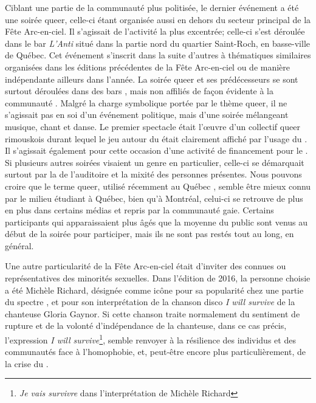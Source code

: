 Ciblant une partie de la communauté plus politisée, le dernier événement a été une soirée queer, celle-ci étant organisée aussi en dehors du secteur principal de la Fête Arc-en-ciel.
Il s'agissait de l'activité la plus excentrée; celle-ci s'est déroulée dans le bar \emph{L'Anti} situé dans la partie nord du quartier Saint-Roch, en basse-ville de Québec.
Cet événement  s'inscrit dans la suite d'autres à thématiques similaires organisées dans les éditions précédentes de la Fête Arc-en-ciel ou de manière indépendante ailleurs dans l'année.
La soirée queer et ses prédécesseurs se sont surtout déroulées dans des bars , mais non affiliés de façon évidente à la communauté \lgbt.
Malgré la charge symbolique portée par le thème queer, il ne s'agissait pas en soi d'un événement politique, mais d'une soirée mélangeant musique, chant et danse.
Le premier spectacle était l'œuvre d'un collectif queer rimouskois durant lequel le jeu autour du  était clairement affiché par l'usage du .
Il s'agissait également pour cette occasion d'une activité de financement pour le \ggul.
Si plusieurs autres soirées visaient un genre en particulier, celle-ci se démarquait surtout par la  de l'auditoire et la mixité des personnes présentes.
Nous pouvons croire que le terme queer, utilisé récemment au Québec \citep[voir][]{Laprade2014}, semble être mieux connu par le milieu étudiant \lgbt{} à Québec, bien qu'à Montréal, celui-ci se retrouve de plus en plus dans certains médias et repris par la communauté gaie.
Certains participants qui apparaissaient plus âgés que la moyenne du public sont venus au début de la soirée pour participer, mais ils ne sont pas restés tout au long, en général.

Une autre particularité de la Fête Arc-en-ciel était d'inviter des  connues ou représentatives des minorités sexuelles.
Dans l'édition de 2016, la personne choisie a été Michèle Richard, désignée comme icône pour sa popularité chez une partie du spectre \lgbt{}, et pour son interprétation de la chanson disco \emph{I will survive} de la chanteuse Gloria Gaynor.
Si cette chanson traite normalement du sentiment de rupture et de la volonté d'indépendance de la chanteuse, dans ce cas précis, l'expression \emph{I will survive}\footnote{\emph{Je vais survivre} dans l'interprétation de Michèle Richard}, semble renvoyer à la résilience des individus et des communautés \lgbt{} face à l'homophobie, et, peut-être encore plus particulièrement, de la crise du \vih{}.

